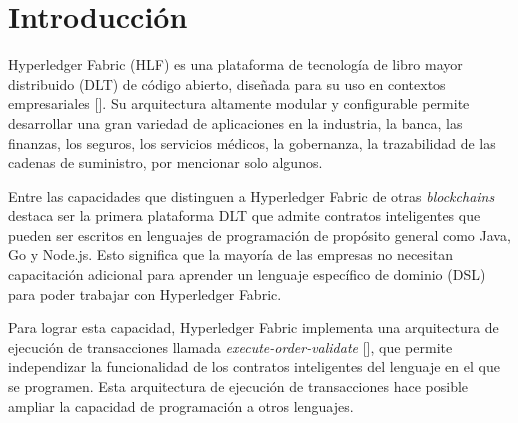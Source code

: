 \chapter*{Introducción}\label{chapter:introduction}

Hyperledger Fabric (HLF) es una plataforma de tecnología de libro mayor distribuido (DLT) de código abierto, diseñada para su uso en contextos empresariales [\cite{hlf-doc}]. Su arquitectura altamente modular y configurable permite desarrollar una gran variedad de aplicaciones en la industria, la banca, las finanzas, los seguros, los servicios médicos, la gobernanza, la trazabilidad de las cadenas de suministro, por mencionar solo algunos.

Entre las capacidades que distinguen a Hyperledger Fabric de otras \textit{blockchains} destaca ser la primera plataforma DLT que admite contratos inteligentes que pueden ser escritos en lenguajes de programación de propósito general como Java, Go y Node.js. Esto significa que la mayoría de las empresas no necesitan capacitación adicional para aprender un lenguaje específico de dominio (DSL) para poder trabajar con Hyperledger Fabric.

Para lograr esta capacidad, Hyperledger Fabric implementa una arquitectura de ejecución de transacciones llamada \textit{execute-order-validate} [\cite{hlf-paper}], que permite independizar la funcionalidad de los contratos inteligentes del lenguaje en el que se programen. Esta arquitectura de ejecución de transacciones hace posible ampliar la capacidad de programación a otros lenguajes.



